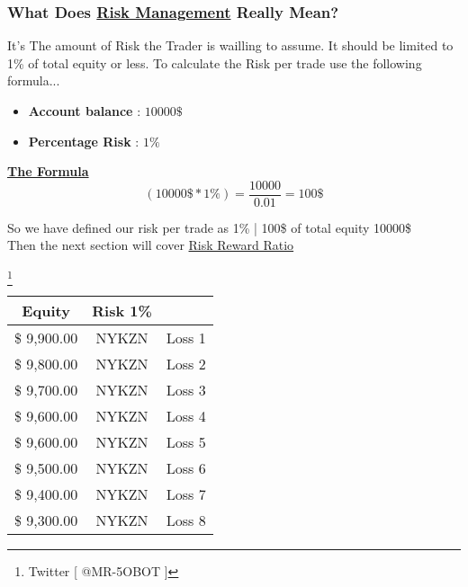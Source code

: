 \documentclass[10pt]{article}
\begin{document}
\subsubsection*{What Does \underline{Risk Management} Really Mean?}
\begin{violetbox}
\small It's The amount of Risk the Trader is wailling to assume. It should be limited to 1\% of total equity or less. To calculate the Risk per trade use the following formula...
\end{violetbox}

\begin{itemize}
  \item \textbf{Account balance} : $ 10000\$ $
  \item  \textbf{Percentage Risk} : $ 1\% $ 
\end{itemize}

\begin{center}
   \textbf{ \underline{The Formula}}
\vspace{0.1cm}
  \[ ( 10000\$ * 1\% ) = \frac{10000}{0.01} = 100\$ \]
\end{center}

\vspace{0.2cm}
\begin{notesbox}
  \small{  So we have defined our risk per trade as 1\% | 100\$ of total equity 10000\$ \\
  Then the next section will cover \underline{Risk Reward Ratio}}
\end{notesbox}

\footnote{Twitter [ @MR-5OBOT ]}
\newpage 

\renewcommand{\arraystretch}{1.5} %
\setlength{\tabcolsep}{10pt} %

\begin{tabular}{|c|c|c|}
  \cline{1-2}
 \rowcolor{gray!30} Equity & Risk 1\% \\
  \hline 
  \$ 9,900.00 & NYKZN & Loss 1 \\  
  \hline 
  \$ 9,800.00 & NYKZN & Loss 2 \\  
  \hline            
  \$ 9,700.00 & NYKZN & Loss 3 \\  
  \hline            
  \$ 9,600.00 & NYKZN & Loss 4 \\  
  \hline            
  \$ 9,600.00 & NYKZN & Loss 5 \\  
  \hline            
  \$ 9,500.00 & NYKZN & Loss 6 \\  
  \hline            
  \$ 9,400.00 & NYKZN & Loss 7 \\  
  \hline            
  \$ 9,300.00 & NYKZN & Loss 8 \\  
  \hline
\end{tabular}
\end{document}
